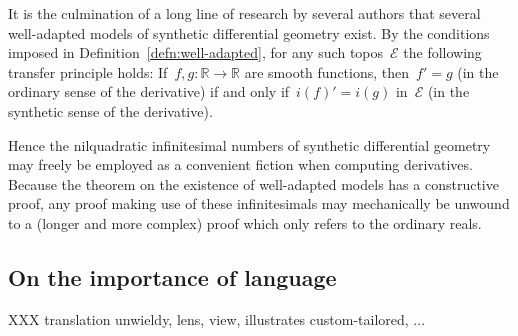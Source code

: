 \documentclass[oneside,reqno]{amsart}
\theoremstyle{definition}
\theoremstyle{plain}
\theoremstyle{remark}
\newcommand{\E}{\mathcal{E}}
\newcommand{\RR}{\mathbb{R}}
\renewcommand{\_}{\mathpunct{.}\,}
\newcommand{\?}{\,{:}\,}
\begin{document}
It is the culmination of a long line of research by several authors that
several well-adapted models of synthetic differential geometry exist. By the
conditions imposed in Definition~\ref{defn:well-adapted}, for any such
topos~$\E$ the following transfer principle holds: If~$f,g : \RR \to \RR$ are
smooth functions, then~$f' = g$ (in the ordinary sense of the derivative) if
and only if~$i(f)' = i(g)$ in~$\E$ (in the synthetic sense of the derivative).

Hence the nilquadratic infinitesimal numbers of synthetic differential geometry
may freely be employed as a convenient fiction when computing derivatives.
Because the theorem on the existence of well-adapted models has a constructive
proof, any proof making use of these infinitesimals may mechanically be
unwound to a (longer and more complex) proof which only refers to the ordinary
reals.


\subsection{On the importance of language}

XXX translation unwieldy, lens, view, illustrates custom-tailored, ...

\printbibliography
\end{document}
